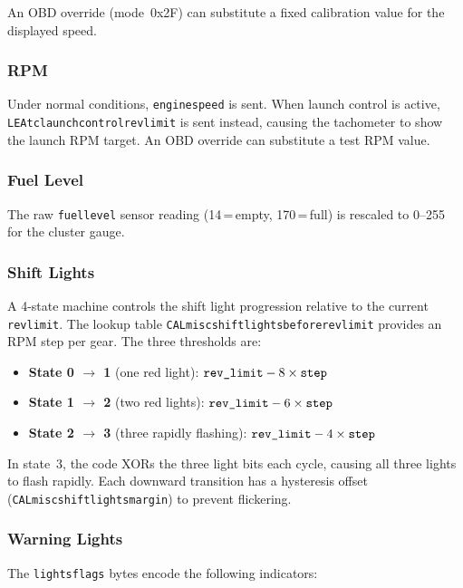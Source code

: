 \documentclass[a4paper,11pt]{article}
\renewcommand{\_}{\oldunderscore\allowbreak}
\begin{document}
An OBD override (mode~0x2F) can substitute a fixed calibration value for
the displayed speed.

\subsubsection*{RPM}

Under normal conditions, \texttt{engine\_speed\_2} is sent. When launch control
is active, \texttt{LEA\_tc\_launchcontrol\_revlimit} is sent instead, causing the
tachometer to show the launch RPM target. An OBD override can substitute a
test RPM value.

\subsubsection*{Fuel Level}

The raw \texttt{fuel\_level} sensor reading (14\,=\,empty, 170\,=\,full) is
rescaled to 0--255 for the cluster gauge.

\subsubsection*{Shift Lights}

A 4-state machine controls the shift light progression relative to the current
\texttt{rev\_limit}. The lookup table
\texttt{CAL\_misc\_shift\_lights\_before\_revlimit} provides an RPM step
per gear. The three thresholds are:

\begin{itemize}
\item \textbf{State 0 $\to$ 1} (one red light): $\texttt{rev\_limit} - 8 \times \texttt{step}$
\item \textbf{State 1 $\to$ 2} (two red lights): $\texttt{rev\_limit} - 6 \times \texttt{step}$
\item \textbf{State 2 $\to$ 3} (three rapidly flashing): $\texttt{rev\_limit} - 4 \times \texttt{step}$
\end{itemize}

In state~3, the code XORs the three light bits each cycle, causing all three
lights to flash rapidly. Each downward transition has a hysteresis offset
(\texttt{CAL\_misc\_shift\_lights\_margin}) to prevent flickering.

\subsubsection*{Warning Lights}

The \texttt{lights\_flags} bytes encode the following indicators:
\end{document}
